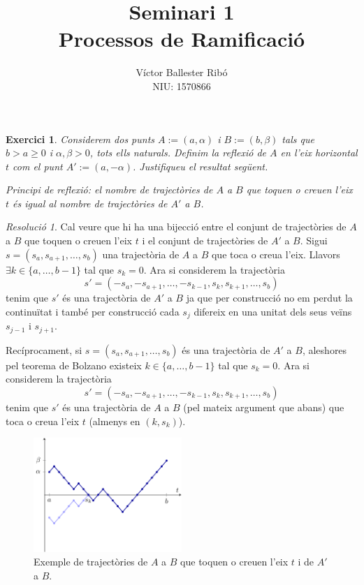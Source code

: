 \documentclass[10pt,a4paper]{article}
\title{\bfseries\Large Seminari 1\\Processos de Ramificació}
\author{Víctor Ballester Ribó\\NIU: 1570866}
\date{\parbox{\linewidth}{\centering
  Processos estocàstics\endgraf
  Grau en Matemàtiques\endgraf
  Universitat Autònoma de Barcelona\endgraf
  Març de 2023}}
\newtheorem{exercici}{Exercici}
\theoremstyle{definition}
\theoremstyle{remark}
\newtheorem*{res}{Resolució}
\begin{document}
\maketitle
\begin{exercici}
  Considerem dos punts $A:=(a,\alpha)$ i $B:=(b,\beta)$ tals que $b>a\geq 0$ i $\alpha,\beta>0$, tots ells naturals. Definim la reflexió de $A$ en l'eix horizontal $t$ com el punt $A':=(a,-\alpha)$. Justifiqueu el resultat següent.

  Principi de reflexió: el nombre de trajectòries de $A$ a $B$ que toquen o creuen l'eix $t$ és igual al nombre de trajectòries de $A'$ a $B$.
\end{exercici}
\begin{res}
  Cal veure que hi ha una bijecció entre el conjunt de trajectòries de $A$ a $B$ que toquen o creuen l'eix $t$ i el conjunt de trajectòries de $A'$ a $B$. Sigui $s=(s_a,s_{a+1},\ldots,s_b)$ una trajectòria de $A$ a $B$ que toca o creua l'eix. Llavors $\exists k\in\{a,\ldots,b-1\}$ tal que $s_k=0$. Ara si considerem la trajectòria $$s'=(-s_a,-s_{a+1},\ldots,-s_{k-1},s_k,s_{k+1},\ldots,s_b)$$ tenim que $s'$ és una trajectòria de $A'$ a $B$ ja que per construcció no em perdut la continuïtat i també per construcció cada $s_j$ difereix en una unitat dels seus veïns $s_{j-1}$ i $s_{j+1}$.

  Recíprocament, si $s=(s_a,s_{a+1},\ldots,s_b)$ és una trajectòria de $A'$ a $B$, aleshores pel teorema de Bolzano existeix $k\in\{a,\ldots,b-1\}$ tal que $s_k=0$. Ara si considerem la trajectòria $$s'=(-s_a,-s_{a+1},\ldots,-s_{k-1},s_k,s_{k+1},\ldots,s_b)$$ tenim que $s'$ és una trajectòria de $A$ a $B$ (pel mateix argument que abans) que toca o creua l'eix $t$ (almenys en $(k,s_k)$).

  \begin{figure}[ht]
    \centering
    \includegraphics[width=0.5\textwidth]{Images/trajectoria.pdf}
    \caption{Exemple de trajectòries de $A$ a $B$ que toquen o creuen l'eix $t$ i de $A'$ a $B$.}
  \end{figure}
\end{res}
\end{document}
